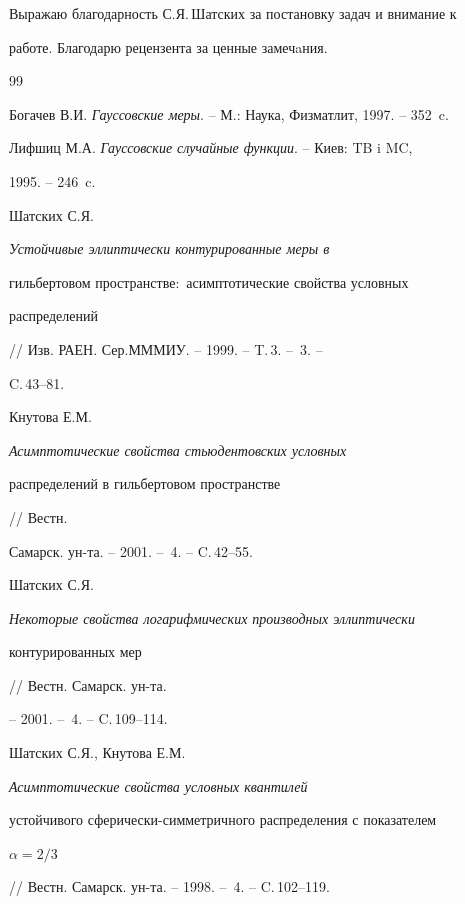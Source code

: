 Выражаю благодарность С.Я.\,Шатских за постановку задач и внимание к


работе. Благодарю рецензента за ценные замечaния.











\begin{thebibliography}{99}







Богачев В.И. {\it Гауссовские меры}. -- М.: Наука, Физматлит, 1997. -- 352~c.




Лифшиц М.А. {\it Гауссовские случайные функции}. -- Киев: TB i MC,


1995. -- 246~c.




Шатских С.Я. {\it Устойчивые эллиптически контурированные меры в


гильбертовом пространстве\/${:}$ асимптотические свойства условных


распределений} // Изв. РАЕН. Сер.\linebreak МММИУ. -- 1999. -- T.\,3. -- \No\,3. --


C.\,43--81.




Кнутова Е.М. {\it Асимптотические свойства стьюдентовских условных 


распределений в гильбертовом пространстве} // Вестн.


Самарск. ун-та. -- 2001. -- \No\,4. -- C.\,42--55.




Шатских С.Я. {\it Некоторые свойства логарифмических производных эллиптически 


контурированных мер} // Вестн. Самарск. ун-та.


-- 2001. -- \No\,4. -- C.\,109--114.




Шатских С.Я., Кнутова Е.М. {\it Асимптотические свойства условных квантилей 


устойчивого сферически-симметричного распределения с показателем


$\alpha=2/3$} // Вестн. Самарск. ун-та. -- 1998. -- \No\,4. -- C.\,102--119.



\end{thebibliography}
